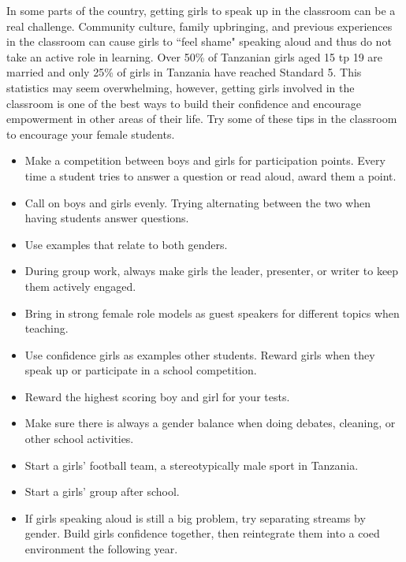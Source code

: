 In some parts of the country, getting girls to speak up in the classroom can be a real challenge.  Community culture, family upbringing, and previous experiences in the classroom can cause girls to ``feel shame" speaking aloud and thus do not take an active role in learning.  Over 50\% of Tanzanian girls aged 15 tp 19 are married and only 25\% of girls in Tanzania have reached Standard 5. This statistics may seem overwhelming, however, getting girls involved in the classroom is one of the best ways to build their confidence and encourage empowerment in other areas of their life.  Try some of these tips in the classroom to encourage your female students.

\begin{itemize}
 \item Make a competition between boys and girls for participation points.  Every time a student tries to answer a question or read aloud, award them a point.  
 \item Call on boys and girls evenly.  Trying alternating between the two when having students answer questions.
 \item Use examples that relate to both genders.
 \item During group work, always make girls the leader, presenter, or writer to keep them actively engaged.
 \item Bring in strong female role models as guest speakers for different topics when teaching.
 \item Use confidence girls as examples other students. Reward girls when they speak up or participate in a school competition.
 \item Reward the highest scoring boy and girl for your tests.
 \item Make sure there is always a gender balance when doing debates, cleaning, or other school activities.
 \item Start a girls' football team, a stereotypically male sport in Tanzania.
 \item Start a girls' group after school.
 \item If girls speaking aloud is still a big problem, try separating streams by gender.  Build girls confidence together, then reintegrate them into a coed environment the following year.  
\end{itemize}

\begin{center}
\setlength\fboxsep{0pt}
\setlength\fboxrule{2pt}
\end{center}